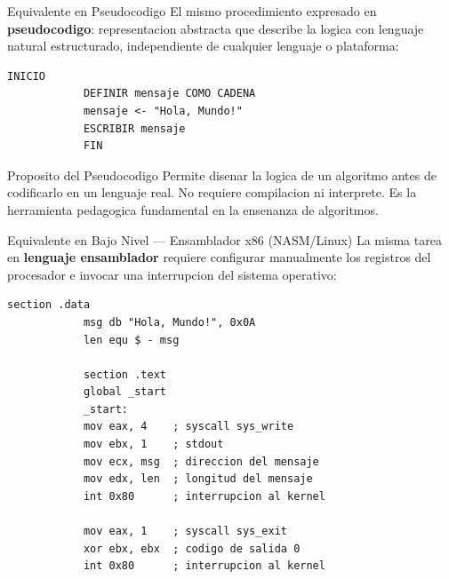 \documentclass[10pt, aspectratio=169]{beamer}
\begin{document}
	\begin{frame}[fragile]{Equivalente en Pseudocodigo}
		El mismo procedimiento expresado en \textbf{pseudocodigo}: representacion abstracta
		que describe la logica con lenguaje natural estructurado, independiente de cualquier
		lenguaje o plataforma:
		\vspace{0.3cm}
		\begin{lstlisting}[language={}]
			INICIO
			DEFINIR mensaje COMO CADENA
			mensaje <- "Hola, Mundo!"
			ESCRIBIR mensaje
			FIN
		\end{lstlisting}
		\vspace{0.3cm}
		\begin{block}{Proposito del Pseudocodigo}
			Permite disenar la logica de un algoritmo antes de codificarlo en un lenguaje
			real. No requiere compilacion ni interprete. Es la herramienta pedagogica
			fundamental en la ensenanza de algoritmos.
		\end{block}
	\end{frame}
	
	\begin{frame}[fragile]{Equivalente en Bajo Nivel --- Ensamblador x86 (NASM/Linux)}
		La misma tarea en \textbf{lenguaje ensamblador} requiere configurar manualmente
		los registros del procesador e invocar una interrupcion del sistema operativo:
		\vspace{0.2cm}
		\begin{lstlisting}[language={[x86masm]Assembler}]
			section .data
			msg db "Hola, Mundo!", 0x0A
			len equ $ - msg
			
			section .text
			global _start
			_start:
			mov eax, 4    ; syscall sys_write
			mov ebx, 1    ; stdout
			mov ecx, msg  ; direccion del mensaje
			mov edx, len  ; longitud del mensaje
			int 0x80      ; interrupcion al kernel
			
			mov eax, 1    ; syscall sys_exit
			xor ebx, ebx  ; codigo de salida 0
			int 0x80      ; interrupcion al kernel
		\end{lstlisting}
	\end{frame}
	
\end{document}
